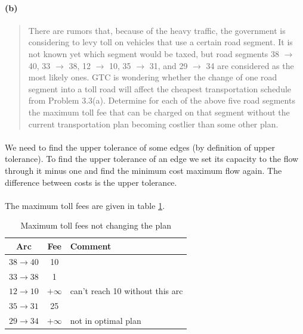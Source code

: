 \paragraph{(b)}
\begin{quote}
There are rumors that, because of the heavy traffic, the government is considering to levy toll on vehicles that use a certain road segment. It is not known yet which segment would be taxed, but road segments 38 $\rightarrow$ 40, 33 $\rightarrow$ 38, 12 $\rightarrow$ 10, 35 $\rightarrow$ 31, and 29 $\rightarrow$ 34 are considered as the most likely ones.
GTC is wondering whether the change of one road segment into a toll road will affect the cheapest transportation schedule from Problem 3.3(a). Determine for each of the above five road segments the maximum toll fee that can be charged on that segment without the current transportation plan becoming costlier than some other plan.
\end{quote}

\paragraph{}
We need to find the upper tolerance of some edges (by definition of upper tolerance). To find the upper tolerance of an edge we set its capacity to the flow through it minus one and find the minimum cost maximum flow again. The difference between costs is the upper tolerance.

\paragraph{}
The maximum toll fees are given in table \ref{toll-fees}.

\begin{table}[H]
\centering
\begin{tabular}{|c|c|l|}
\hline
Arc & Fee & Comment \\ \hline
$ 38 \rightarrow 40 $ & 10 & \\ \hline
$ 33 \rightarrow 38 $ & 1 & \\ \hline
$ 12 \rightarrow 10 $ & $+\infty$ & can't reach 10 without this arc \\ \hline
$ 35 \rightarrow 31 $ & 25 & \\ \hline
$ 29 \rightarrow 34 $ & $+\infty$ & not in optimal plan \\ \hline
\end{tabular}
\caption{Maximum toll fees not changing the plan}
\label{toll-fees}
\end{table}

